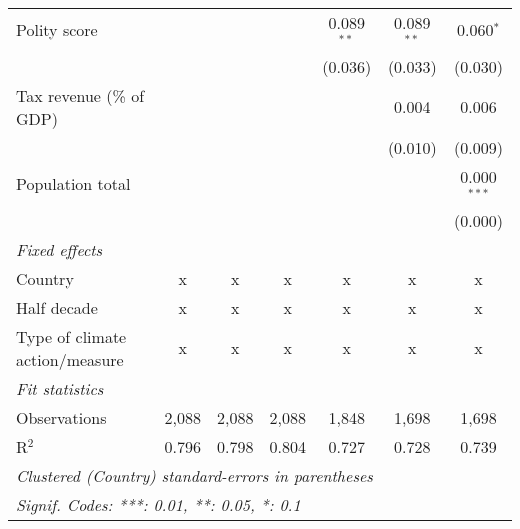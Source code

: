\begin{tabular}{lcccccc}
   Polity score                                                 &         &              &                & 0.089$^{**}$   & 0.089$^{**}$  & 0.060$^{*}$\\   
                                                                &         &              &                & (0.036)        & (0.033)       & (0.030)\\   
   Tax revenue (\% of GDP)                                      &         &              &                &                & 0.004         & 0.006\\   
                                                                &         &              &                &                & (0.010)       & (0.009)\\   
   Population total                                             &         &              &                &                &               & 0.000$^{***}$\\   
                                                                &         &              &                &                &               & (0.000)\\   
   \emph{Fixed effects}\\
   Country                                                      & x       & x            & x              & x              & x             & x\\  
   Half decade                                                  & x       & x            & x              & x              & x             & x\\  
   Type of climate action/measure                               & x       & x            & x              & x              & x             & x\\  
   \midrule \emph{Fit statistics}\\
   Observations                                                 & 2,088   & 2,088        & 2,088          & 1,848          & 1,698         & 1,698\\  
   R$^2$                                                        & 0.796   & 0.798        & 0.804          & 0.727          & 0.728         & 0.739\\  
   \midrule
   \multicolumn{7}{l}{\emph{Clustered (Country) standard-errors in parentheses}}\\
   \multicolumn{7}{l}{\emph{Signif. Codes: ***: 0.01, **: 0.05, *: 0.1}}\\
\end{tabular}
\par\endgroup


